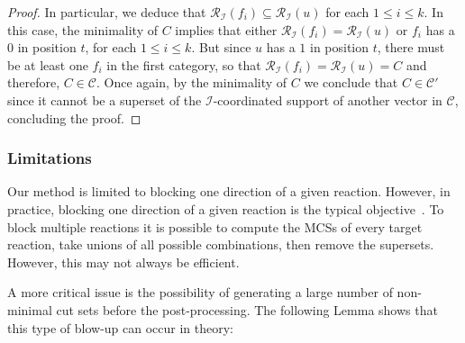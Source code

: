 \documentclass{bioinfo}
\theoremstyle{plain}
\theoremstyle{definition}
\begin{document}
\begin{proof}
In particular, we deduce that $\mathcal{R}_{\mathcal{I}}(f_i) \subseteq \mathcal{R}_{\mathcal{I}}(u)$ for each $1 \leq i \leq k$. In this case, the minimality of $C$ implies that either $\mathcal{R}_{\mathcal{I}}(f_i) = \mathcal{R}_{\mathcal{I}}(u)$ or $f_i$ has a 0 in position $t$, for each $1 \leq i \leq k$. But since $u$ has a $1$ in position $t$, there must be at least one $f_i$ in the first category, so that $\mathcal{R}_{\mathcal{I}}(f_i) = \mathcal{R}_{\mathcal{I}}(u) = C$ and therefore, $C \in \mathcal{C}$. Once again, by the minimality of $C$ we conclude that $C \in \mathcal{C'}$ since it cannot be a superset of the $\mathcal{I}$-coordinated support of another vector in $\mathcal{C}$, concluding the proof.
\end{proof}


\subsubsection{Limitations}
Our method is limited to blocking one direction of a given reaction. %
However, in practice, blocking one direction of a given reaction is the typical objective~\cite{one_direction}. To block multiple reactions it is possible to compute the MCSs of every target reaction, take unions of all possible combinations, then remove the supersets.  However, this may not always be efficient.  %

A more critical issue is the possibility of generating a large number of non-minimal cut sets before the post-processing. %
The following Lemma shows that this type of blow-up can occur in theory:
\end{document}
